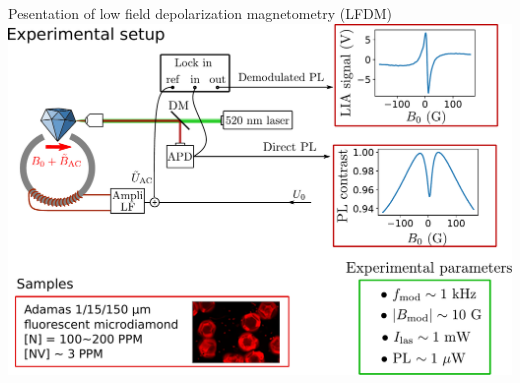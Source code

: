 \documentclass{beamer}
\begin{document}
%
%
%
%
%
%
%

%
\begin{frame}{Pesentation of low field depolarization magnetometry (LFDM)}
\centering
\includegraphics[width=\textwidth,height=0.9\textheight,keepaspectratio]{Slide_principle_LFDM}
\end{frame}
\end{document}
